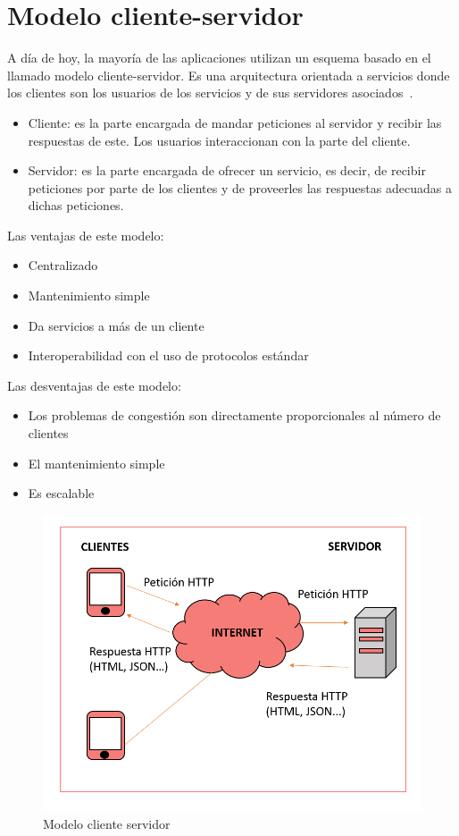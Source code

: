 \documentclass[a4paper, 12pt]{book}
\begin{document}
\section{Modelo cliente-servidor} 
\label{sec:seccion1}
A día de hoy, la mayoría de las aplicaciones utilizan un esquema basado en el llamado modelo cliente-servidor. Es una arquitectura orientada a servicios donde los clientes son los usuarios de los servicios y de sus servidores asociados~\cite{castro2015arquitectura}.
 \begin{itemize}
          \item
         Cliente: es la parte encargada de mandar peticiones al servidor y recibir las respuestas de este. Los usuarios interaccionan con la parte del cliente.
          \item
          Servidor: es la parte encargada de ofrecer un servicio, es decir, de recibir peticiones por parte de los clientes y de proveerles las respuestas adecuadas a dichas peticiones.~\cite{lizama2016redes} 
     \end{itemize}
     
Las ventajas de este modelo:
\begin{itemize}
    \item Centralizado
    \item Mantenimiento simple
    \item Da servicios a más de un cliente 
    \item Interoperabilidad con el uso de protocolos estándar
\end{itemize}

Las desventajas de este modelo:
\begin{itemize}
    \item Los problemas de congestión son directamente proporcionales al número de clientes
    \item El mantenimiento simple
    \item Es escalable~\cite{lizama2016redes} 
\end{itemize}

\begin{figure}[h]
        \centering
        \includegraphics[scale=0.4]{img/Cliente-Servidor.png}
        \caption{Modelo cliente servidor}
        \label{figura:cliente-servidor}
    \end{figure}
\end{document}
